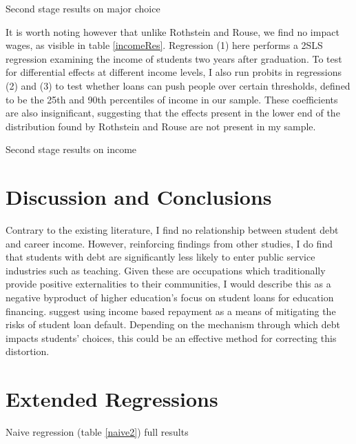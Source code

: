\documentclass[12pt]{article}
\newcommand{\regs}{../Analysis/Regressions/Output/}
\begin{document}
	\begin{table}
		\centering
		\caption{Second stage results on major choice}		
		
		\label{majChoice}
	\end{table}
	
	It is worth noting however that unlike Rothstein and Rouse, we find no impact wages, as visible in table \ref{incomeRes}. Regression (1) here performs a 2SLS regression examining the income of students two years after graduation. To test for differential effects at different income levels, I also run probits in regressions (2) and (3) to test whether loans can push people over certain thresholds, defined to be the 25th and 90th percentiles of income in our sample. These coefficients are also insignificant, suggesting that the effects present in the lower end of the distribution found by Rothstein and Rouse are not present in my sample.
	
	\begin{table}
		\centering
		\caption{Second stage results on income}		
		
		\label{incomeRes}
	\end{table}
	
	\section{Discussion and Conclusions}
	
	Contrary to the existing literature, I find no relationship between student debt and career income. However, reinforcing findings from other studies, I do find that students with debt are significantly less likely to enter public service industries such as teaching. Given these are occupations which traditionally provide positive externalities to their communities, I would describe this as a negative byproduct of higher education's focus on student loans for education financing. \textcite{abraham2018} suggest using income based repayment as a means of mitigating the risks of student loan default. Depending on the mechanism through which debt impacts students' choices, this could be an effective method for correcting this distortion.
	\clearpage
	\appendix
	\section{Extended Regressions}
	
	\begin{table}
		\centering
		\caption{Naive regression (table \ref{naive2}) full results}
		
		\label{naivefull}
	\end{table}
\end{document}
